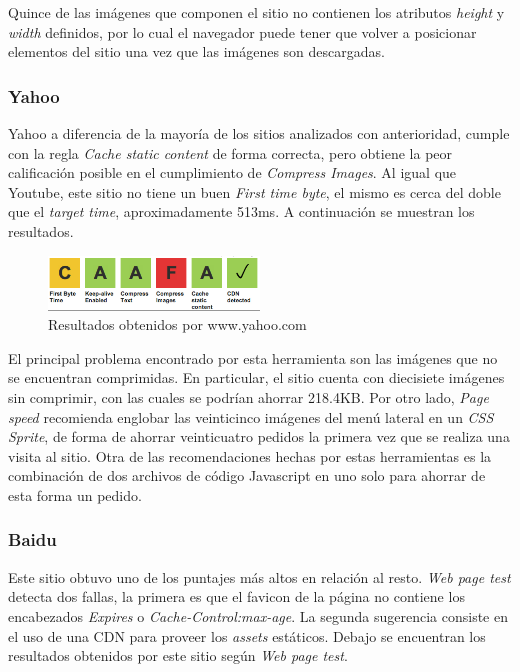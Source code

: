 Quince de las imágenes que componen el sitio no contienen los atributos \emph{height} y \emph{width} definidos, por lo cual el navegador puede tener que volver a posicionar elementos
del sitio una vez que las imágenes son descargadas.

\subsubsection{Yahoo}

Yahoo a diferencia de la mayoría de los sitios analizados con anterioridad, cumple con la regla \emph{Cache static content} de forma correcta, pero obtiene la peor calificación posible
en el cumplimiento de \emph{Compress Images}. Al igual que Youtube, este sitio no tiene un buen \emph{First time byte}, el mismo es cerca del doble que el \emph{target time},
aproximadamente 513ms. A continuación se muestran los resultados.

\begin{figure}[h]
\centering
\includegraphics[width=0.5\textwidth]{figuras/lado_cliente/yahoo/page_results.png}
  \caption{Resultados obtenidos por www.yahoo.com}
    \label{fig.yahoo_page_results}
\end{figure}

El principal problema encontrado por esta herramienta son las imágenes que no se encuentran comprimidas. En particular, el sitio cuenta con diecisiete imágenes sin comprimir,
con las cuales se podrían ahorrar 218.4KB. Por otro lado, \emph{Page speed} recomienda englobar las veinticinco imágenes del menú lateral en un \emph{CSS Sprite}, de forma de
ahorrar veinticuatro pedidos la primera vez que se realiza una visita al sitio.
Otra de las recomendaciones hechas por estas herramientas es la combinación de dos archivos de código Javascript en uno solo para ahorrar de esta forma un pedido.

\subsubsection{Baidu}

Este sitio obtuvo uno de los puntajes más altos en relación al resto. \emph{Web page test} detecta dos fallas, la primera es que el favicon de la página no contiene
los encabezados \emph{Expires} o \emph{Cache-Control:max-age}. La segunda sugerencia consiste en el uso de una CDN para proveer los \emph{assets} estáticos. Debajo se encuentran
los resultados obtenidos por este sitio según \emph{Web page test}.

